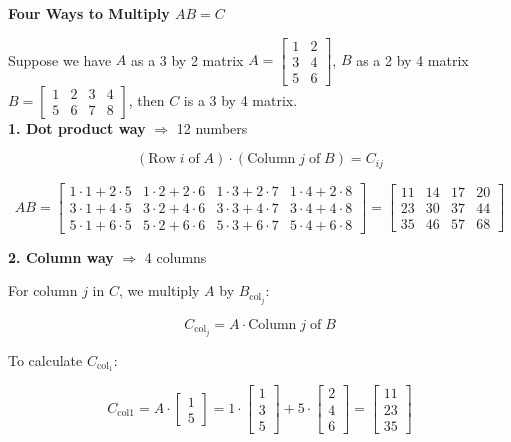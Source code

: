 \vspace{0.5cm}
\noindent\textbf{Four Ways to Multiply $AB = C$}

\noindent Suppose we have $A$ as a 3 by 2 matrix $A =
	\begin{bmatrix}
		1 & 2 \\
		3 & 4 \\
		5 & 6
	\end{bmatrix}$, $B$ as a 2 by 4 matrix $B = \begin{bmatrix}
		1 & 2 & 3 & 4 \\
		5 & 6 & 7 & 8
	\end{bmatrix}$, then $C$ is a 3 by 4 matrix. \\

\noindent\textbf{1. Dot product way} $\Rightarrow$ 12 numbers

\[(\text{Row} \; i \; \text{of} \; A) \cdot (\text{Column} \; j \; \text{of} \; B) = C_{ij}\]

\[
	AB =
	\begin{bmatrix}
		1 \cdot 1 + 2 \cdot 5 & 1 \cdot 2 + 2 \cdot 6 & 1 \cdot 3 + 2 \cdot 7 & 1 \cdot 4 + 2 \cdot 8 \\
		3 \cdot 1 + 4 \cdot 5 & 3 \cdot 2 + 4 \cdot 6 & 3 \cdot 3 + 4 \cdot 7 & 3 \cdot 4 + 4 \cdot 8 \\
		5 \cdot 1 + 6 \cdot 5 & 5 \cdot 2 + 6 \cdot 6 & 5 \cdot 3 + 6 \cdot 7 & 5 \cdot 4 + 6 \cdot 8
	\end{bmatrix}
	=
	\begin{bmatrix}
		11 & 14 & 17 & 20 \\
		23 & 30 & 37 & 44 \\
		35 & 46 & 57 & 68
	\end{bmatrix}
\]

\noindent\textbf{2. Column way} $\Rightarrow$ 4 columns

\noindent For column $j$ in $C$, we multiply $A$ by $B_{\text{col}_j}$:

\[C_{\text{col}_j} = A \cdot \text{Column} \; j \; \text{of} \; B\]

\noindent To calculate $C_{\text{col}_1}$:

\[
	C_{\text{col}1} = A \cdot \begin{bmatrix}
		1 \\ 5
	\end{bmatrix}
	=
	1 \cdot \begin{bmatrix}
		1 \\ 3 \\ 5
	\end{bmatrix}
	+ 5 \cdot \begin{bmatrix}
		2 \\ 4 \\ 6
	\end{bmatrix}
	=
	\begin{bmatrix}
		11 \\ 23 \\ 35
	\end{bmatrix}
\]

